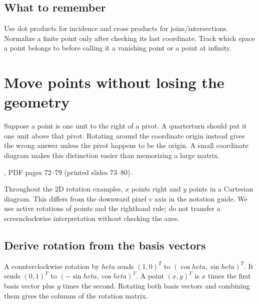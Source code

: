 \documentclass[letterpaper,11pt,english,openany,oneside]{jupyterBook}
\begin{document}
\subsection{What to remember}
\label{\detokenize{lectures/lecture01/projective:what-to-remember}}
\sphinxAtStartPar
Use dot products for incidence and cross products for joins/intersections. Normalize a finite point only after checking its last coordinate. Track which space a point belongs to before calling it a vanishing point or a point at infinity.

\sphinxstepscope


\section{Move points without losing the geometry}
\label{\detokenize{lectures/lecture01/transformations:move-points-without-losing-the-geometry}}\label{\detokenize{lectures/lecture01/transformations:lec01-transformations}}\label{\detokenize{lectures/lecture01/transformations::doc}}
\sphinxAtStartPar
Suppose a point is one unit to the right of a pivot. A quarter\sphinxhyphen{}turn should put it one unit above that pivot. Rotating around the coordinate origin instead gives the wrong answer unless the pivot happens to be the origin. A small coordinate diagram makes this distinction easier than memorizing a large matrix.

\sphinxAtStartPar
{} , PDF pages 72–79 (printed slides 73–80).

\sphinxAtStartPar
Throughout the 2D rotation examples, \(x\) points right and \(y\) points  in a Cartesian diagram. This differs from the downward pixel \(v\) axis in the notation guide. We use active rotations of points and the right\sphinxhyphen{}hand rule; do not transfer a screen\sphinxhyphen{}clockwise interpretation without checking the axes.


\subsection{Derive rotation from the basis vectors}
\label{\detokenize{lectures/lecture01/transformations:derive-rotation-from-the-basis-vectors}}
\sphinxAtStartPar
A counterclockwise rotation by \(	heta\) sends \((1,0)^T\) to \((\cos	heta,\sin	heta)^T\). It sends \((0,1)^T\) to \((-\sin	heta,\cos	heta)^T\). A point \((x,y)^T\) is \(x\) times the first basis vector plus \(y\) times the second. Rotating both basis vectors and combining them gives the columns of the rotation matrix.
\end{document}
